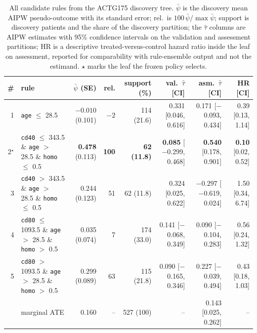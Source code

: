 \documentclass[conference]{IEEEtran}
\begin{document}
\begin{table}[t]
\caption{All candidate rules from the ACTG175 discovery tree. $\bar\psi$ is
the discovery mean AIPW pseudo-outcome with its standard error; rel.\ is
$100\,\bar\psi/\max\bar\psi$; support is discovery patients and the share of
the discovery partition; the $\hat\tau$ columns are AIPW estimates with 95\%
confidence intervals on the validation and assessment partitions; HR is a
descriptive treated-versus-control hazard ratio inside the leaf on assessment,
reported for comparability with rule-ensemble output and not the estimand.
$\star$ marks the leaf the frozen policy selects.}
\label{tab:rules}
\centering
\scriptsize
\setlength{\tabcolsep}{3pt}
\begin{tabular}{@{}r p{} rrrrrr@{}}
\toprule
\# & rule & $\bar\psi$ (SE) & rel. & support (\%) & val.\ $\hat\tau$ [CI]
& asm.\ $\hat\tau$ [CI] & HR [CI]\\
\midrule
1 & \texttt{age} $\le$ 28.5 & $-0.010$ (0.101) & $-2$ & 114 (21.6)
& 0.331 [0.046, 0.616] & 0.171 [$-$0.093, 0.434] & 0.39 [0.13, 1.14]\\
2$^{\star}$ & \texttt{cd40} $\le$ 343.5 \& \texttt{age} $>$ 28.5 \&
\texttt{homo} $\le$ 0.5 & \textbf{0.478} (0.113) & \textbf{100} &
\textbf{62 (11.8)} & \textbf{0.085} [$-$0.299, 0.468] &
\textbf{0.540} [0.178, 0.901] & \textbf{0.10} [0.02, 0.52]\\
3 & \texttt{cd40} $>$ 343.5 \& \texttt{age} $>$ 28.5 \& \texttt{homo} $\le$ 0.5
& 0.244 (0.123) & 51 & 62 (11.8) & 0.324 [0.025, 0.622] &
$-0.297$ [$-$0.619, 0.024] & 1.50 [0.34, 6.74]\\
4 & \texttt{cd80} $\le$ 1093.5 \& \texttt{age} $>$ 28.5 \& \texttt{homo} $>$ 0.5
& 0.035 (0.074) & 7 & 174 (33.0) & 0.141 [$-$0.068, 0.349] &
0.090 [$-$0.104, 0.283] & 0.56 [0.24, 1.32]\\
5 & \texttt{cd80} $>$ 1093.5 \& \texttt{age} $>$ 28.5 \& \texttt{homo} $>$ 0.5
& 0.299 (0.089) & 63 & 115 (21.8) & 0.090 [$-$0.165, 0.346] &
0.227 [$-$0.039, 0.494] & 0.43 [0.18, 1.03]\\
\midrule
& marginal ATE & 0.160 & -- & 527 (100) & -- & 0.143 [0.025, 0.262] & --\\
\bottomrule
\end{tabular}
\end{table}
\end{document}
